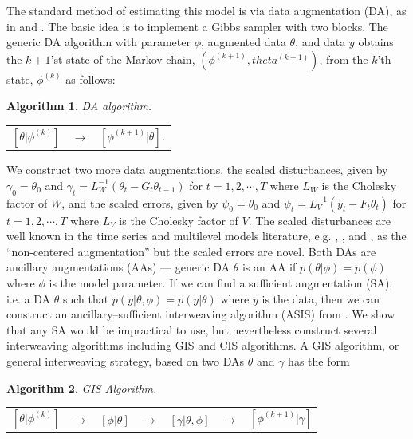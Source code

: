 \documentclass{article}\usepackage[]{graphicx}\usepackage[]{color}
\newtheorem{alg}{Algorithm}
\begin{document}
The standard method of estimating this model is via data augmentation (DA), as in \citet{fruhwirth1994data} and \citet{carter1994gibbs}. The basic idea is to implement a Gibbs sampler with two blocks. The generic DA algorithm with parameter $\phi$, augmented data $\theta$, and data $y$ obtains the $k+1$'st state of the Markov chain, $(\phi^{(k+1)},theta^{(k+1)})$, from the $k$'th state, $\phi^{(k)}$ as follows:
\begin{alg}DA algorithm.\label{alg:DA}\\
  \begin{center}
    \begin{tabular}{lll}
      $[\theta|\phi^{(k)}]$& $\to$& $[\phi^{(k+1)}|\theta]$.
    \end{tabular}
  \end{center}
\end{alg}
We construct two more data augmentations, the scaled disturbances, given by $\gamma_0=\theta_0$ and $\gamma_t = L_W^{-1}(\theta_t-G_t\theta_{t-1})$ for $t=1,2,\cdots,T$ where $L_W$ is the Cholesky factor of $W$, and the scaled errors, given by $\psi_0=\theta_0$ and $\psi_t=L_V^{-1}(y_t - F_t\theta_t)$ for $t=1,2,\cdots,T$ where $L_V$ is the Cholesky factor of $V$. The scaled disturbances are well known in the time series and multilevel models literature, e.g. \cite{fruhwirth2004efficient}, \citet{papaspiliopoulos2007general}, and \citet{van2001art}, as the ``non-centered augmentation'' but the scaled errors are novel. Both DAs are ancillary augmentations (AAs) --- generic DA $\theta$ is an AA if $p(\theta|\phi)=p(\phi)$ where $\phi$ is the model parameter. If we can find a sufficient augmentation (SA), i.e. a DA $\theta$ such that $p(y|\theta,\phi)=p(y|\theta)$ where $y$ is the data, then we can construct an ancillary--sufficient interweaving algorithm (ASIS) from \citet{yu2011center}. We show that any SA would be impractical to use, but nevertheless construct several interweaving algorithms including GIS and CIS algorithms. A GIS algorithm, or general interweaving strategy, based on two DAs $\theta$ and $\gamma$ has the form
\begin{alg}GIS Algorithm.\label{alg:GIS}\\
  \begin{center}
    \begin{tabular}{lllllll}
      $[\theta|\phi^{(k)}]$& $\to$& $[\phi|\theta]$& $\to $&$[\gamma|\theta,\phi]$& $\to$& $[\phi^{(k+1)}|\gamma]$
    \end{tabular}
  \end{center}
\end{alg}
\end{document}
